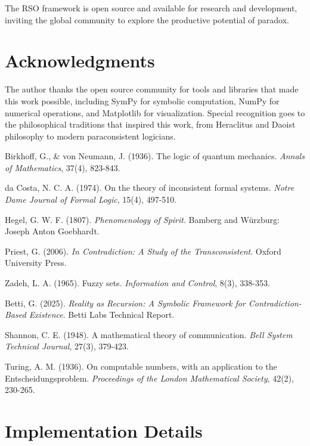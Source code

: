 \documentclass[11pt,a4paper]{article}
\begin{document}
The RSO framework is open source and available for research and development, inviting the global community to explore the productive potential of paradox.

\section*{Acknowledgments}

The author thanks the open source community for tools and libraries that made this work possible, including SymPy for symbolic computation, NumPy for numerical operations, and Matplotlib for visualization. Special recognition goes to the philosophical traditions that inspired this work, from Heraclitus and Daoist philosophy to modern paraconsistent logicians.

\begin{thebibliography}{99}

Birkhoff, G., \& von Neumann, J. (1936). The logic of quantum mechanics. \textit{Annals of Mathematics}, 37(4), 823-843.

da Costa, N. C. A. (1974). On the theory of inconsistent formal systems. \textit{Notre Dame Journal of Formal Logic}, 15(4), 497-510.

Hegel, G. W. F. (1807). \textit{Phenomenology of Spirit}. Bamberg and Würzburg: Joseph Anton Goebhardt.

Priest, G. (2006). \textit{In Contradiction: A Study of the Transconsistent}. Oxford University Press.

Zadeh, L. A. (1965). Fuzzy sets. \textit{Information and Control}, 8(3), 338-353.

Betti, G. (2025). \textit{Reality as Recursion: A Symbolic Framework for Contradiction-Based Existence}. Betti Labs Technical Report.

Shannon, C. E. (1948). A mathematical theory of communication. \textit{Bell System Technical Journal}, 27(3), 379-423.

Turing, A. M. (1936). On computable numbers, with an application to the Entscheidungsproblem. \textit{Proceedings of the London Mathematical Society}, 42(2), 230-265.

\end{thebibliography}

\appendix

\section{Implementation Details}
\end{document}
